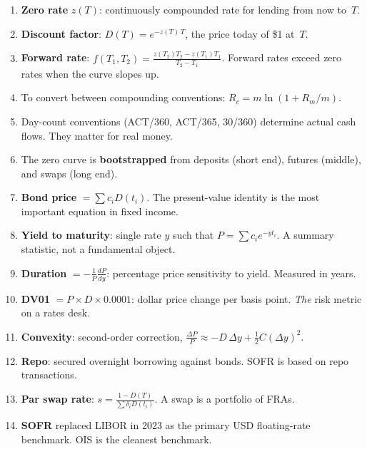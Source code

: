 \begin{enumerate}
  \item \textbf{Zero rate} $z(T)$: continuously compounded rate for
    lending from now to~$T$.

  \item \textbf{Discount factor}: $D(T) = e^{-z(T)\,T}$, the
    price today of \$1 at~$T$.

  \item \textbf{Forward rate}:
    $f(T_1,T_2) = \frac{z(T_2)T_2 - z(T_1)T_1}{T_2 - T_1}$.
    Forward rates exceed zero rates when the curve slopes up.

  \item To convert between compounding conventions:
    $R_c = m\ln(1 + R_m/m)$.

  \item Day-count conventions (ACT/360, ACT/365, 30/360) determine
    actual cash flows.  They matter for real money.

  \item The zero curve is \textbf{bootstrapped} from deposits
    (short end), futures (middle), and swaps (long end).

  \item \textbf{Bond price} $= \sum c_i D(t_i)$.  The present-value
    identity is the most important equation in fixed income.

  \item \textbf{Yield to maturity}: single rate $y$ such that
    $P = \sum c_i e^{-y t_i}$.  A summary statistic, not a
    fundamental object.

  \item \textbf{Duration}
    $= -\frac{1}{P}\frac{dP}{dy}$: percentage price sensitivity
    to yield.  Measured in years.

  \item \textbf{DV01} $= P \times D \times 0.0001$: dollar price
    change per basis point.  \emph{The} risk metric on a rates desk.

  \item \textbf{Convexity}: second-order correction,
    $\frac{\Delta P}{P} \approx -D\,\Delta y +
    \frac{1}{2}C(\Delta y)^2$.

  \item \textbf{Repo}: secured overnight borrowing against bonds.
    SOFR is based on repo transactions.

  \item \textbf{Par swap rate}:
    $s = \frac{1-D(T)}{\sum \delta_i D(t_i)}$.
    A swap is a portfolio of FRAs.

  \item \textbf{SOFR} replaced LIBOR in 2023 as the primary
    USD floating-rate benchmark.  OIS is the cleanest benchmark.
\end{enumerate}
